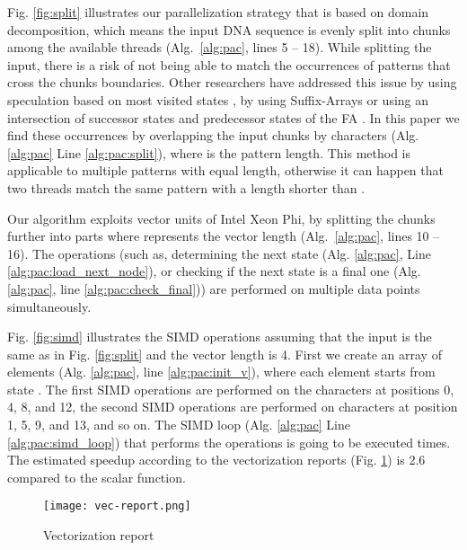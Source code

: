 \documentclass[conference]{IEEEtran}
\begin{document}
Fig. \ref{fig:split} illustrates our parallelization strategy that is based on domain decomposition, which means the input DNA sequence is evenly split into chunks among the available threads (Alg.~\ref{alg:pac}, lines 5 -- 18). While splitting the input, there is a risk of not being able to match the occurrences of patterns that cross the chunks boundaries. Other researchers have addressed this issue by using speculation based on most visited states \cite{LuchaupSEJ11}, by using Suffix-Arrays \cite{Chacon} or using an intersection of successor states and predecessor states of the FA \cite{memeti2014}. In this paper we find these occurrences by overlapping the input chunks by  characters (Alg. \ref{alg:pac} Line \ref{alg:pac:split}), where  is the pattern length. This method is applicable to multiple patterns with equal length, otherwise it can happen that two threads match the same pattern with a length shorter than .




Our algorithm exploits vector units of Intel Xeon Phi, by splitting the chunks further into  parts where  represents the vector length (Alg.~\ref{alg:pac}, lines 10 -- 16). The operations (such as, determining the next state (Alg. \ref{alg:pac}, Line \ref{alg:pac:load_next_node}), or checking if the next state is a final one (Alg. \ref{alg:pac}, line \ref{alg:pac:check_final})) are performed on multiple data points simultaneously. 

Fig. \ref{fig:simd} illustrates the SIMD operations assuming that the input is the same as in Fig. \ref{fig:split} and the vector length is 4. First we create an array of  elements (Alg. \ref{alg:pac}, line \ref{alg:pac:init_v}), where each element starts from state . The first SIMD  operations are performed on the characters at positions 0, 4, 8, and 12, the second SIMD operations are performed on characters at position 1, 5, 9, and 13, and so on. The SIMD loop (Alg. \ref{alg:pac} Line \ref{alg:pac:simd_loop}) that performs the  operations is going to be executed  times. The estimated speedup according to the vectorization reports (Fig. \ref{fig:vec-report}) is 2.6 compared to the scalar  function.

\begin{figure}[h]
	\centering
	\texttt{[image: vec-report.png]}
	\caption{Vectorization report}
	\label{fig:vec-report}
	\vspace{-10pt}
\end{figure}
\end{document}
